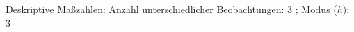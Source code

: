 				\label{tableValues:aocc40a}
				\vspace*{-\baselineskip}
                    \begin{noten}
                	    \note{} Deskriptive Maßzahlen:
                	    Anzahl unterschiedlicher Beobachtungen: 3%
                	    ; 
                	      Modus ($h$): 3
                     \end{noten}

